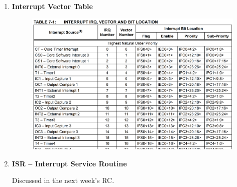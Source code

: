 \documentclass[a4paper]{article}
\begin{document}
\begin{enumerate}[label = \arabic*.]
    \item \textbf{Interrupt Vector Table}
      \begin{figure}[H]
        \centering
        \includegraphics[width=0.9\linewidth]{Interrupt_table.png}
        \label{fig:Interrupt_table.png}
      \end{figure}

    \item \textbf{ISR -- Interrupt Service Routine}
      \par Discussed in the next week's RC\@.

  \end{enumerate}
\end{document}
